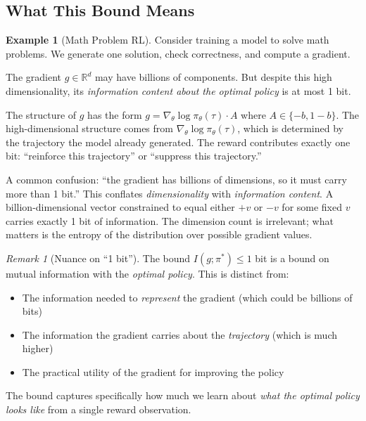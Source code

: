 \documentclass[11pt,a4paper]{article}
\theoremstyle{definition}
\newtheorem{example}[theorem]{Example}
\theoremstyle{remark}
\newtheorem{remark}[theorem]{Remark}
\newcommand{\R}{\mathbb{R}}
\begin{document}
\subsection{What This Bound Means}

\begin{example}[Math Problem RL]
Consider training a model to solve math problems. We generate one solution, check correctness, and compute a gradient.

The gradient $g \in \R^d$ may have billions of components. But despite this high dimensionality, its \emph{information content about the optimal policy} is at most 1 bit.

The structure of $g$ has the form $g = \nabla_\theta \log \pi_\theta(\tau) \cdot A$ where $A \in \{-b, 1-b\}$. The high-dimensional structure comes from $\nabla_\theta \log \pi_\theta(\tau)$, which is determined by the trajectory the model already generated. The reward contributes exactly one bit: ``reinforce this trajectory'' or ``suppress this trajectory.''
\end{example}

\begin{warning}
A common confusion: ``the gradient has billions of dimensions, so it must carry more than 1 bit.'' This conflates \emph{dimensionality} with \emph{information content}. A billion-dimensional vector constrained to equal either $+v$ or $-v$ for some fixed $v$ carries exactly 1 bit of information. The dimension count is irrelevant; what matters is the entropy of the distribution over possible gradient values.
\end{warning}

\begin{remark}[Nuance on ``1 bit'']
The bound $I(g; \pi^*) \leq 1$ bit is a bound on mutual information with the \emph{optimal policy}. This is distinct from:
\begin{itemize}
    \item The information needed to \emph{represent} the gradient (which could be billions of bits)
    \item The information the gradient carries about the \emph{trajectory} (which is much higher)
    \item The practical utility of the gradient for improving the policy
\end{itemize}
The bound captures specifically how much we learn about \emph{what the optimal policy looks like} from a single reward observation.
\end{remark}
\end{document}
